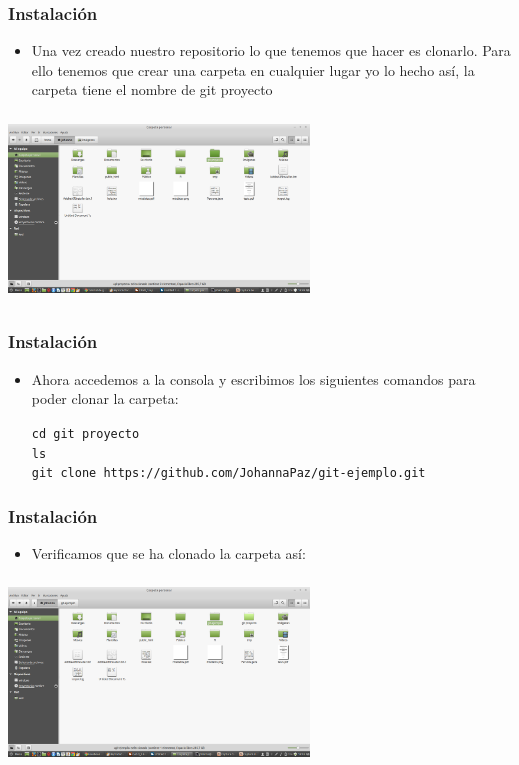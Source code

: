 \documentclass{beamer}
\begin{document}
	\begin{frame}
		\frametitle{Instalación}
		{\small
		\begin{itemize}
			\item {\sffamily Una vez creado nuestro repositorio lo que tenemos que hacer es clonarlo.
			Para ello tenemos que crear una carpeta en cualquier lugar yo lo hecho así, la carpeta tiene el nombre de 				git proyecto}
		\end{itemize}}
		\begin{center}
			\includegraphics[width=8cm,height=5cm]{manual-img6.png}
		\end{center}
	\end{frame}
	\begin{frame}
		\frametitle{Instalación}
		\begin{itemize}
			\item Ahora accedemos a la consola y escribimos los siguientes comandos para
			poder clonar la carpeta:
			\begin{center}
				 {\tt \scriptsize cd git proyecto}\\
				 {\tt \scriptsize ls}\\
				 {\tt \scriptsize git clone https://github.com/JohannaPaz/git-ejemplo.git}\\
			\end{center}
		\end{itemize}
	\end{frame}

	\begin{frame}
		\frametitle{Instalación}
		\begin{itemize}
			\item Verificamos que se ha clonado la carpeta así:
		\end{itemize}
		\begin{center}
			\includegraphics[width=8cm,height=5cm]{manual-img7.png}
		\end{center}
	\end{frame}
	
\end{document}
